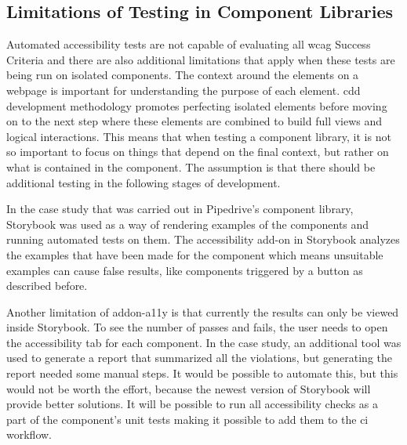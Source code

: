 \documentclass{master_thesis}
\begin{document}
\subsection{Limitations of Testing in Component Libraries}

Automated accessibility tests are not capable of evaluating all \ac{wcag} Success Criteria and there are also additional limitations that apply when these tests are being run on isolated components. The context around the elements on a webpage is important for understanding the purpose of each element. \ac{cdd} development methodology promotes perfecting isolated elements before moving on to the next step where these elements are combined to build full views and logical interactions. This means that when testing a component library, it is not so important to focus on things that depend on the final context, but rather on what is contained in the component. The assumption is that there should be additional testing in the following stages of development.

In the case study that was carried out in Pipedrive's component library, Storybook was used as a way of rendering examples of the components and running automated tests on them. The accessibility add-on in Storybook analyzes the examples that have been made for the component which means unsuitable examples can cause false results, like components triggered by a button as described before.

Another limitation of addon-a11y is that currently the results can only be viewed inside Storybook. To see the number of passes and fails, the user needs to open the accessibility tab for each component. In the case study, an additional tool was used to generate a report that summarized all the violations, but generating the report needed some manual steps. It would be possible to automate this, but this would not be worth the effort, because the newest version of Storybook will provide better solutions. It will be possible to run all accessibility checks as a part of the component's unit tests making it possible to add them to the \ac{ci} workflow.
\end{document}

